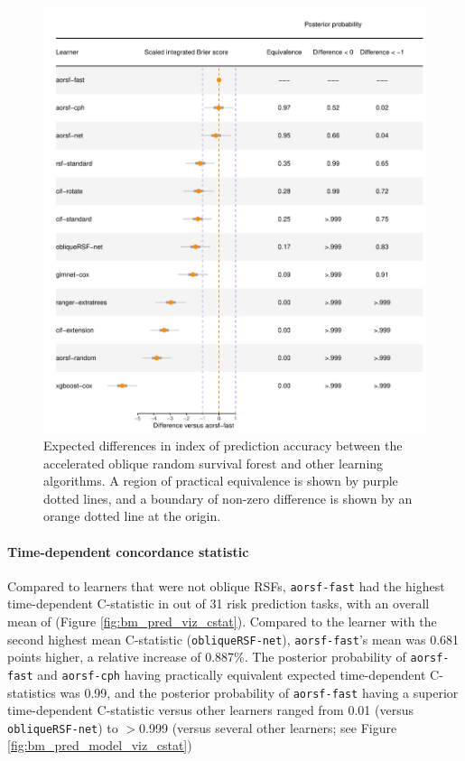 \documentclass[twoside,11pt]{article}\usepackage[]{graphicx}\usepackage[]{xcolor}
\makeatletter
\def\maxwidth{ %
  \ifdim\Gin@nat@width>\linewidth
    \linewidth
  \else
    \Gin@nat@width
  \fi
}
\newenvironment{knitrout}{}{} %
\makeatother
\begin{document}
\begin{knitrout}
\color{fgcolor}\begin{figure}
\includegraphics[width=\maxwidth]{figure/bm_pred_model_viz_ibs-1} \caption[Expected differences in index of prediction accuracy between the accelerated oblique random survival forest and other learning algorithms]{Expected differences in index of prediction accuracy between the accelerated oblique random survival forest and other learning algorithms. A region of practical equivalence is shown by purple dotted lines, and a boundary of non-zero difference is shown by an orange dotted line at the origin.}\label{fig:bm_pred_model_viz_ibs}
\end{figure}

\end{knitrout}

\paragraph{Time-dependent concordance statistic}




Compared to learners that were not oblique RSFs, \texttt{aorsf-fast} had the highest time-dependent C-statistic in  out of 31 risk prediction tasks, with an overall mean of  (Figure \ref{fig:bm_pred_viz_cstat}). Compared to the learner with the second highest mean C-statistic (\texttt{obliqueRSF-net}), \texttt{aorsf-fast}'s mean was 0.681 points higher, a relative increase of 0.887\%. The posterior probability of \texttt{aorsf-fast} and \texttt{aorsf-cph} having practically equivalent expected time-dependent C-statistics was 0.99, and the posterior probability of \texttt{aorsf-fast} having a superior time-dependent C-statistic versus other learners ranged from 0.01 (versus \texttt{obliqueRSF-net}) to $>$0.999 (versus several other learners; see Figure \ref{fig:bm_pred_model_viz_cstat})
\end{document}
